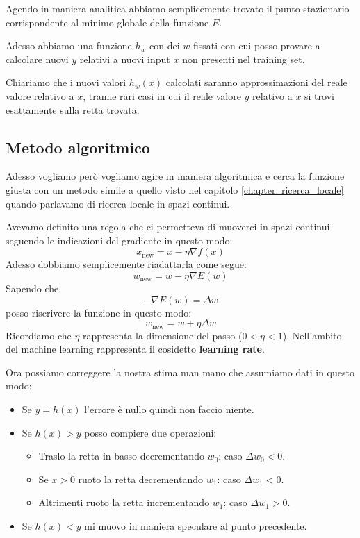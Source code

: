 Agendo in maniera analitica abbiamo semplicemente trovato il punto stazionario corrispondente al minimo globale della
funzione $E$.

Adesso abbiamo una funzione $h_w$ con dei $w$ fissati con cui posso provare a calcolare nuovi $y$ relativi a nuovi
input $x$ non presenti nel training set.

Chiariamo che i nuovi valori $h_w(x)$ calcolati saranno approssimazioni del reale valore relativo a $x$, tranne rari casi
in cui il reale valore $y$ relativo a $x$ si trovi esattamente sulla retta trovata.

\subsection{Metodo algoritmico}
Adesso vogliamo per\`o vogliamo agire in maniera algoritmica e cerca la funzione giusta con un metodo simile a quello
visto nel capitolo \ref{chapter: ricerca_locale} quando parlavamo di ricerca locale in spazi continui.

Avevamo definito una regola che ci permetteva di muoverci in spazi continui seguendo le indicazioni del gradiente in questo
modo:
\[ x_{\text{new}} = x - \eta \nabla f(x) \]
Adesso dobbiamo semplicemente riadattarla come segue:
\[ w_{\text{new}} = w - \eta \nabla E(w) \]
Sapendo che
\[ -\nabla E(w) = \Delta w \]
posso riscrivere la funzione in questo modo:
\[ w_{\text{new}} = w + \eta \Delta w \]
Ricordiamo che $\eta$ rappresenta la dimensione del passo ($0 < \eta < 1$). Nell'ambito del machine learning rappresenta il cosidetto
\textbf{learning rate}.

Ora possiamo correggere la nostra stima man mano che assumiamo dati in questo modo:
\begin{itemize}
	\item Se $y = h(x)$ l'errore \`e nullo quindi non faccio niente.
	\item Se $h(x) > y$ posso compiere due operazioni:
	      \begin{itemize}
		      \item Traslo la retta in basso decrementando $w_0$: caso $\Delta w_0 < 0$.
		      \item Se $x > 0$ ruoto la retta decrementando $w_1$: caso $\Delta w_1 < 0$.
		      \item Altrimenti ruoto la retta incrementando $w_1$: caso $\Delta w_1 > 0$.
	      \end{itemize}
	\item Se $h(x) < y$ mi muovo in maniera speculare al punto precedente.
\end{itemize}


